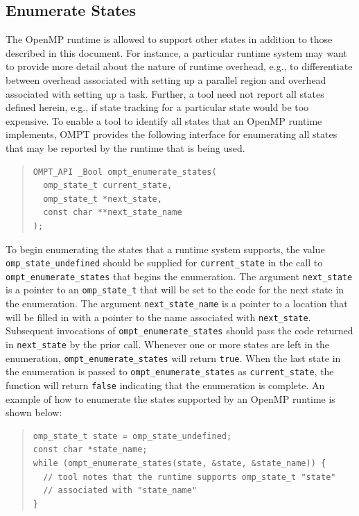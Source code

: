 \documentclass{article}
\begin{document}
 \subsection{Enumerate States}
 \label{ompt_enumerate_states}
 
 The OpenMP runtime is allowed to support other states in addition to those described in this document.
For instance, a particular runtime system may want to 
provide more detail about the nature of runtime overhead, 
e.g., to differentiate between  overhead associated with setting up a parallel region
and  overhead associated with setting up a task. Further, a tool need not report all states defined herein, e.g., if state tracking for a particular state would be too expensive.
To enable a tool to identify all states that an OpenMP runtime implements, OMPT provides
the following interface for enumerating all states that may be reported by the runtime that is being used.

\begin{quote}
\begin{verbatim}
OMPT_API _Bool ompt_enumerate_states(
  omp_state_t current_state, 
  omp_state_t *next_state, 
  const char **next_state_name
);
\end{verbatim}
\end{quote}

\noindent
To begin enumerating the states that a runtime system supports,
the value \verb|omp_state_undefined| should be supplied for \verb|current_state| in the call to \verb|ompt_enumerate_states| that begins the enumeration.
The argument \verb|next_state| is a pointer to an \verb|omp_state_t| that will be set to the code for the next state in the enumeration.
The argument \verb|next_state_name| is a pointer to a location that will be filled in with a pointer to the name associated with \verb|next_state|. 
Subsequent invocations of \verb|ompt_enumerate_states| should pass the code returned in \verb|next_state| by the prior call.
Whenever one or more states are left in the enumeration, \verb|ompt_enumerate_states| will return \verb|true|.
When the last state in the enumeration is passed to \verb|ompt_enumerate_states| as \verb|current_state|, the function will return \verb|false| indicating that the enumeration is complete.
An example of how to enumerate the states supported by an OpenMP runtime is shown below:

\begin{quote}
\begin{verbatim}
omp_state_t state = omp_state_undefined;
const char *state_name;
while (ompt_enumerate_states(state, &state, &state_name)) {
  // tool notes that the runtime supports omp_state_t "state" 
  // associated with "state_name" 
}
\end{verbatim}
\end{quote}
\end{document}
